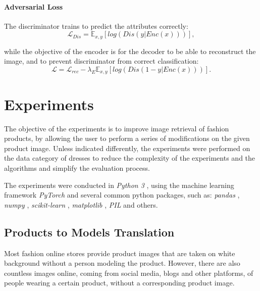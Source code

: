 \documentclass{article}
\begin{document}
\paragraph{Adversarial Loss}
The discriminator trains to predict the attributes correctly:
\begin{equation}
\mathcal{L}_{Dis} = \mathbb{E}_{x,y}[log(Dis(y|Enc(x)))],
\end{equation}

while the objective of the encoder is for the decoder to be able to reconstruct the image, and to prevent discriminator from correct classification:
\begin{equation}
\mathcal{L} = \mathcal{L}_{rec} - \lambda_E \mathbb{E}_{x,y}[log(Dis(1-y|Enc(x)))].
\end{equation}



\pagebreak
\section{Experiments}
The objective of the experiments is to improve image retrieval of fashion products, by allowing the user to perform a series of modifications on the given product image. Unless indicated differently, the experiments were performed on the data category of dresses to reduce the complexity of the experiments and the algorithms and simplify the evaluation process.

The experiments were conducted in \textit{Python 3} \cite{noauthor_welcome_nodate}, using the machine learning framework \textit{PyTorch} \cite{noauthor_pytorch_nodate} and several common python packages, such as: \textit{pandas} \cite{noauthor_python_nodate}, \textit{numpy} \cite{noauthor_numpy_nodate}, \textit{scikit-learn} \cite{noauthor_scikit-learn_nodate}, \textit{matplotlib} \cite{noauthor_matplotlib_nodate}, \textit{PIL} \cite{noauthor_pillow_nodate} and others. 


\pagebreak
\subsection{Products to Models Translation}
Most fashion online stores provide product images that are taken on white background without a person modeling the product. However, there are also countless images online, coming from social media, blogs and other platforms, of people wearing a certain product, without a corresponding product image. 
\end{document}
